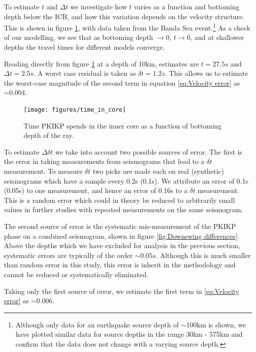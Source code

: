 \documentclass[11pt,a4paper]{article}
\begin{document}
To estimate $t$ and $\Delta t$ we investigate how $t$ varies as a function and bottoming depth below the ICB, and how this variation depends on the velocity structure. This is shown in figure \ref{fig:Time in core}, with data taken from the Banda Sea event.\footnote{Although only data for an earthquake source depth of $\sim$100km is shown, we have plotted similar data for source depths in the range 30km - 575km and confirm that the data does not change with a varying source depth.} As a check of our modelling, we see that as bottoming depth $\rightarrow 0$, $t \rightarrow 0$, and at shallower depths the travel times for different models converge. 

Reading directly from figure \ref{fig:Time in core} at a depth of 10km, estimates are $t = 27.5s$ and $\Delta t = 2.5s$. A worst case residual is taken as $\delta t = 1.2s$. This allows us to estimate the worst-case magnitude of the second term in equation \eqref{eq:Velocity error} as $\sim 0.004$.

\begin{figure}
	\centering
	\texttt{[image: figures/time\_in\_core]}
	\caption{Time PKIKP spends in the inner core as a function of bottoming depth of the ray.}
	\label{fig:Time in core}
\end{figure}

To estimate $\Delta \delta t$ we take into account two possible sources of error. The first is the error in taking measurements from seismograms that lead to a $\delta t$ measurement. To measure $\delta t$ two picks are made each on real (synthetic) seismograms which have a sample every 0.2s (0.1s). We attribute an error of 0.1s (0.05s) to one measurement, and hence an error of 0.16s to a $\delta t$ measurement. This is a random error which could in theory be reduced to arbitrarily small values in further studies with repeated measurements on the same seismogram.

The second source of error is the systematic mis-measurement of the PKIKP phase on a combined seismogram, shown in figure \ref{fig:Downswing differences}. Above the depths which we have excluded for analysis in the previous section, systematic errors are typically of the order $\sim 0.05s$. Although this is much smaller than random error in this study, this error is inherit in the methodology and cannot be reduced or systematically eliminated.

Taking only the first source of error, we estimate the first term in \eqref{eq:Velocity error} as $\sim 0.006$.
\end{document}
